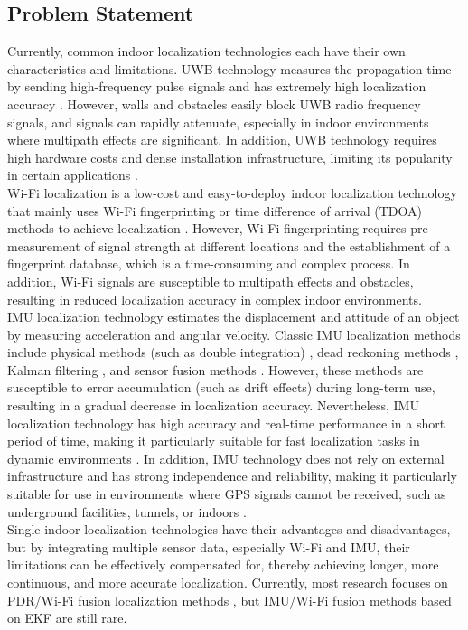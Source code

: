 \documentclass[12pt,a4paper]{article}
\numberwithin{equation}{section}
\begin{document}
\subsection{Problem Statement}
Currently, common indoor localization technologies each have their own characteristics and limitations. UWB technology measures the propagation time by sending high-frequency pulse signals and has extremely high localization accuracy \cite{fontana2004recent}. However, walls and obstacles easily block UWB radio frequency signals, and signals can rapidly attenuate, especially in indoor environments where multipath effects are significant. In addition, UWB technology requires high hardware costs and dense installation infrastructure, limiting its popularity in certain applications \cite{farahsari2022survey}.\\
Wi-Fi localization is a low-cost and easy-to-deploy indoor localization technology that mainly uses Wi-Fi fingerprinting or time difference of arrival (TDOA) methods to achieve localization \cite{yiu2017wireless,gustafsson2003positioning}. However, Wi-Fi fingerprinting requires pre-measurement of signal strength at different locations and the establishment of a fingerprint database, which is a time-consuming and complex process. In addition, Wi-Fi signals are susceptible to multipath effects and obstacles, resulting in reduced localization accuracy in complex indoor environments.\\
IMU localization technology estimates the displacement and attitude of an object by measuring acceleration and angular velocity. Classic IMU localization methods include physical methods (such as double integration) \cite{yan2018ridi}, dead reckoning methods \cite{jirawimut2003method}, Kalman filtering \cite{caron2006gps}, and sensor fusion methods \cite{dehzangi2017imu}. However, these methods are susceptible to error accumulation (such as drift effects) during long-term use, resulting in a gradual decrease in localization accuracy. Nevertheless, IMU localization technology has high accuracy and real-time performance in a short period of time, making it particularly suitable for fast localization tasks in dynamic environments \cite{marins2001improved}. In addition, IMU technology does not rely on external infrastructure and has strong independence and reliability, making it particularly suitable for use in environments where GPS signals cannot be received, such as underground facilities, tunnels, or indoors \cite{wu2015indoor}.\\
Single indoor localization technologies have their advantages and disadvantages, but by integrating multiple sensor data, especially Wi-Fi and IMU, their limitations can be effectively compensated for, thereby achieving longer, more continuous, and more accurate localization. Currently, most research focuses on PDR/Wi-Fi fusion localization methods \cite{liu2021kalman}, but IMU/Wi-Fi fusion methods based on EKF are still rare.\\
\end{document}
